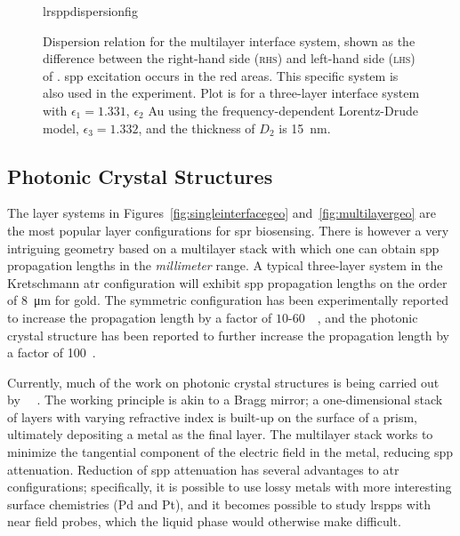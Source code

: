 \begin{figure}[ht]
 \centering
{lrsppdispersionfig}
\caption{Dispersion relation for the multilayer interface system, shown as the difference
				between the right-hand side (\textsc{rhs}) and left-hand side (\textsc{lhs}) of
.  \gls{spp} excitation occurs in the red areas.
This specific system is also used in the experiment.  Plot is for a three-layer interface system with $\epsilon_1=1.331$, $\epsilon_2$ Au using the
frequency-dependent Lorentz-Drude model, $\epsilon_3=1.332$, and the
thickness of $D_2$ is \SI{15}{\nano\meter}.  }
\label{fig:lrsppdispersionrelation}
\end{figure}

\subsection{Photonic Crystal Structures}
The layer systems in Figures~\ref{fig:singleinterfacegeo}
and~\ref{fig:multilayergeo} are the most popular layer
configurations for \gls{spr} biosensing.  There is however a very intriguing
geometry based on a multilayer stack with which one can obtain \gls{spp}
propagation lengths in the \textit{millimeter} range.  A typical three-layer system in the Kretschmann \gls{atr} configuration will exhibit \gls{spp}
propagation lengths on the order of \SI{8}{\micro\meter} for gold.  The
symmetric configuration has been experimentally reported to increase the
propagation length by a factor of
$10$-$60$~\cite{kuwamura1983experimental}~\cite{craig1983experimental}, and
the photonic crystal structure has been reported to further increase the
propagation length by a factor of 100~\cite{konopsky2009long}.

Currently, much of the work on photonic crystal structures is being carried
out by ~\cite{konopsky2006long}~\cite{konopsky2009long}.
The working principle is akin to a Bragg mirror; a one-dimensional stack of
layers with varying refractive index is built-up on the surface of a prism,
ultimately depositing a metal as the final layer.  The multilayer stack
works to minimize the tangential component of the electric field in the
metal, reducing \gls{spp} attenuation.  Reduction of \gls{spp} attenuation has several
advantages to \gls{atr} configurations; specifically, it is possible to use lossy metals with
more interesting surface chemistries (Pd and Pt), and it becomes possible
to study \glspl{lrspp} with near field probes, which the
liquid phase would otherwise make difficult.
